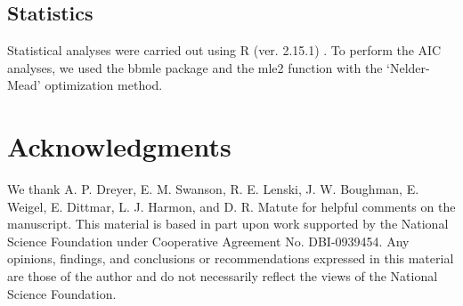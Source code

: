 \begin{doublespace}
\subsection{Statistics}

Statistical analyses were carried out using R (ver. 2.15.1) \citep{r13}.
%
To perform the AIC analyses, we used the bbmle package \citep{bol08}
and the mle2 function with the `Nelder-Mead' optimization method.
%




\section{Acknowledgments}

We thank A. P. Dreyer, E. M. Swanson, R. E. Lenski, J. W. Boughman,
E. Weigel, E. Dittmar, L. J. Harmon, and D. R. Matute
for helpful comments on the manuscript.
%
This material is based in part upon work supported
by the National Science Foundation under Cooperative Agreement No. DBI-0939454.
Any opinions, findings, and conclusions or recommendations
expressed in this material are those of the author
and do not necessarily reflect the views of the National Science Foundation.



\end{doublespace}



